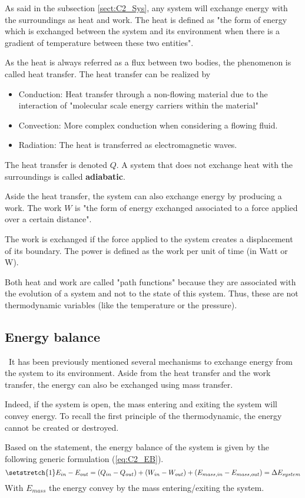 As said in the subsection \ref{sect:C2_Sys}, any system will exchange energy with the surroundings as heat and work. The heat is defined as "the form of energy which is exchanged between the system and its environment when there is a gradient of temperature between these two entities". 

As the heat is always referred as a flux between two bodies, the phenomenon is called heat transfer. The heat transfer can be realized by
\begin{itemize}
    \item Conduction: Heat transfer through a non-flowing material due to the interaction of "molecular scale energy carriers within the material"\cite{GregoryNellis2015}
    \item Convection: More complex conduction when considering a flowing fluid.
    \item Radiation: The heat is transferred as electromagnetic waves.
\end{itemize}
The heat transfer is denoted $Q$. A system that does not exchange heat with the surroundings is called \textbf{adiabatic}.

Aside the heat transfer, the system can also exchange energy by producing a work. The work $W$ is "the form of energy exchanged associated to a force applied over a certain distance". 

The work is exchanged if the force applied to the system creates a displacement of its boundary. The power is defined as the work per unit of time (in Watt or W).

Both heat and work are called "path functions" because they are associated with the evolution of a system and not to the state of this system. Thus, these are not thermodynamic variables (like the temperature or the pressure).
\subsection{Energy balance}
\quad\, It has been previously mentioned several mechanisms to exchange energy from the system to its environment. Aside from the heat transfer and the work transfer, the energy can also be exchanged using mass transfer. 

Indeed, if the system is open, the mass entering and exiting the system will convey energy. To recall the first principle of the thermodynamic, the energy cannot be created or destroyed. 

Based on the statement, the energy balance of the system is given by the following generic formulation (\ref{eq:C2_EB}).
\begin{equation}
\setstretch{1}
    E_{in} - E_{out} = (Q_{in} - Q_{out}) + (W_{in} - W_{out}) + (E_{mass,in} - E_{mass,out}) = \Delta E_{system} \label{eq:C2_EB}
\end{equation}
With $E_{mass}$ the energy convey by the mass entering/exiting the system.

